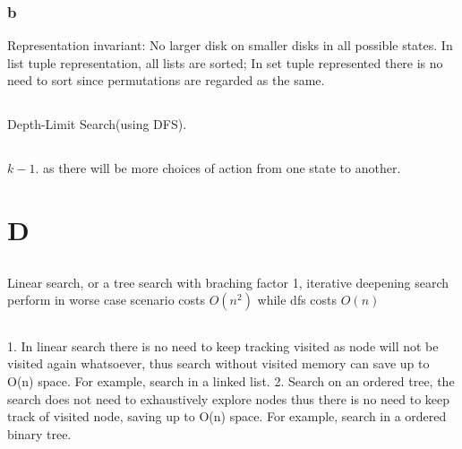 \documentclass{article}
\begin{document}
\subsubsection*{b}
Representation invariant: No larger disk on smaller disks in all possible states. In list tuple representation, all lists are sorted; In set tuple represented there is no need to sort since permutations are regarded as the same.
\subsection{}
Depth-Limit Search(using DFS). 
\subsection{}
$k - 1$. as there will be more choices of action from one state to another.

\section*{}


\section*{}


\section*{D}
\subsection{}
Linear search, or a tree search with braching factor 1, iterative deepening search perform in worse case scenario costs $O(n^2)$
while dfs costs $O(n)$

\subsection{}
1. In linear search there is no need to keep tracking visited as node will not be visited again whatsoever, thus search without visited memory can save up to O(n) space. For example, search in a linked list.\newline
\textcolor{red} {}
2. Search on an ordered tree, the search does not need to exhaustively explore nodes thus there is no need to keep track of visited node, saving up to O(n) space. For example, search in a ordered binary tree. \newline
\textcolor{red} {}
\end{document}
